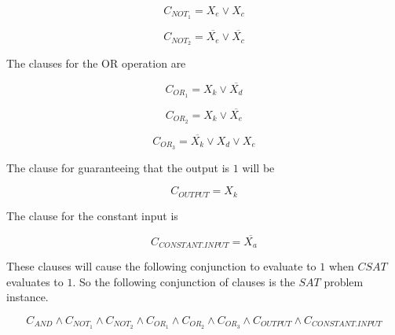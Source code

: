 \documentclass[paper=a4, fontsize=11pt]{scrartcl} %
\numberwithin{equation}{section} %
\numberwithin{figure}{section} %
\numberwithin{table}{section} %
\begin{document}
\begin{enumerate}
$$
C_{NOT_1} = X_e \lor X_c
$$

$$
C_{NOT_2} = \overline{X_e} \lor \overline{X_c}
$$

The clauses for the OR operation are

$$
C_{OR_1} = X_k \lor \overline{X_d}
$$

$$
C_{OR_2} = X_k \lor \overline{X_e}
$$

$$
C_{OR_3} = \overline{X_k} \lor X_d \lor X_e
$$

The clause for guaranteeing that the output is $1$ will be

$$
C_{OUTPUT} = X_k
$$

The clause for the constant input is

$$
C_{CONSTANT.INPUT} = \overline{X_a}
$$ 

These clauses will cause the following conjunction to evaluate to $1$ when $CSAT$ evaluates to $1$. So the following conjunction of clauses is the $SAT$ problem instance.

$$
C_{AND} \land C_{NOT_1} \land C_{NOT_2} \land C_{OR_1} \land C_{OR_2} \land C_{OR_3} \land C_{OUTPUT} \land {C_{CONSTANT.INPUT}}
$$

\end{enumerate}


\end{document}
